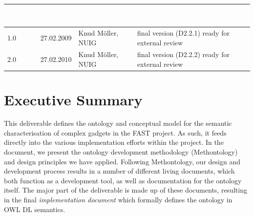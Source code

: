 \documentclass[twoside]{fast_latex}
\newcommand\authorOne{Knud Möller, NUIG}
\begin{document}
\begin{small}
\begin{tabular}{|l|l|l|p{7.5cm}|}
\hline
\rowcolor{fast@lightgrey}\textcolor{white}{\textbf{Rev. No.}} &
                            \textcolor{white}{\textbf{Date}} &
                            \textcolor{white}{\textbf{Author (Partner)}} &
							\textcolor{white}{\textbf{Change description}}\\ \hline
1.0 & 27.02.2009 & \authorOne & final version (D2.2.1) ready for external review \\ \hline
2.0 & 27.02.2010 & \authorOne & final version (D2.2.2) ready for external review \\ \hline
\end{tabular}
\end{small}

\color{black}

\vfill

\newpage


\clearpage

\section*{Executive Summary}
\doublespacing

This deliverable defines the ontology and conceptual model for the semantic characterisation of complex gadgets in the FAST project. As such, it feeds directly into the various implementation efforts within the project. In the document, we present the ontology development methodology (Methontology) and design principles we have applied. Following Methontology, our design and development process results in a number of different living documents, which both function as a development tool, as well as documentation for the ontology itself. The major part of the deliverable is made up of these documents, resulting in the final \emph{implementation document} which formally defines the ontology in OWL DL semantics.
\end{document}
